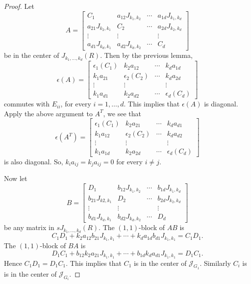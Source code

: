 \documentclass[12pt, a4paper]{amsart}
\numberwithin{equation}{section} %
\theoremstyle{plain}
\theoremstyle{definition}
\theoremstyle{plain}
\theoremstyle{remark}
\newcommand{\sJ}{\mathcal{J}}
\begin{document}
\begin{proof}
Let 
\[A=\begin{bmatrix} 
C_1&a_{12} J_{k_1,k_2} &\cdots & a_{1d}J_{k_1,k_d}\\
a_{21}J_{k_2,k_1} &C_2 &\cdots & a_{2d}J_{k_2,k_d}\\
\vdots&\vdots& &\vdots\\
a_{d1}J_{k_d,k_1}&a_{d2}J_{k_d,k_2}&\cdots& C_d
\end{bmatrix}\] 
be in the center of $J_{k_1,\dots,k_d}(R)$. Then by the previous lemma, 
\[\epsilon(A)
=\begin{bmatrix} 
\epsilon_1(C_1)&k_2a_{12} &\cdots & k_da_{1d}\\
k_1a_{21} &\epsilon_2(C_2) &\cdots & k_da_{2d}\\
\vdots&\vdots& &\vdots\\
k_1a_{d1}&k_2a_{d2}&\cdots& \epsilon_d(C_d)
\end{bmatrix}
\] commutes with $E_{ii}$, for every $i=1,\ldots,d$. 
This implies that $\epsilon(A)$ is diagonal. Apply the above argument to $A^T$, we see that 
\[\epsilon(A^T)
=\begin{bmatrix} 
\epsilon_1(C_1)&k_2a_{21} &\cdots & k_da_{d1}\\
k_1a_{12} &\epsilon_2(C_2) &\cdots & k_da_{d2}\\
\vdots&\vdots& &\vdots\\
k_1a_{1d}&k_2a_{2d}&\cdots& \epsilon_d(C_d)
\end{bmatrix}\]
 is also diagonal. So, $k_i a_{ij}=k_ja_{ij}=0$ for every $i\not=j$.

Now let 
\[B=\begin{bmatrix} 
D_1&b_{12} J_{k_1,k_2} &\cdots & b_{1d}J_{k_1,k_d}\\
b_{21}J_{k2,k_1} &D_2 &\cdots & b_{2d}J_{k_2,k_d}\\
\vdots&\vdots& &\vdots\\
b_{d1}J_{k_d,k_1}&b_{d2}J_{k_d,k_2}&\cdots& D_d
\end{bmatrix}\]
be any matrix in $sJ_{k_1,\dots,k_d}(R)$. The $(1,1)$-block of $AB$ is
\[
C_1D_1+k_2a_{12}b_{21}J_{k_1,k_1}+\cdots+k_da_{1d}b_{d1}J_{k_1,k_1}=C_1D_1.
\]
The $(1,1)$-block of $BA$ is 
\[
D_1C_1+b_{12}k_2a_{21}J_{k_1,k_1}+\cdots+b_{1d}k_da_{d1}J_{k_1,k_1}=D_1C_1.
\]
Hence $C_1D_1=D_1C_1$. This implies that $C_1$ is in the center of $\sJ_{G_1}$. Similarly $C_i$ is  is in the center of $\sJ_{G_i}$.


\end{proof}
\end{document}
